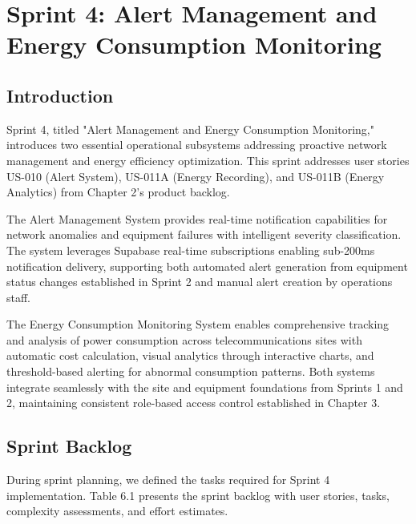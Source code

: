 \newpage

\chapter{Sprint 4: Alert Management and Energy Consumption Monitoring}

\cfoot{\thepage}

\parindent=0.5in
\onehalfspacing

\section{Introduction}

Sprint 4, titled "Alert Management and Energy Consumption Monitoring," introduces two essential operational subsystems addressing proactive network management and energy efficiency optimization. This sprint addresses user stories US-010 (Alert System), US-011A (Energy Recording), and US-011B (Energy Analytics) from Chapter 2's product backlog.

The Alert Management System provides real-time notification capabilities for network anomalies and equipment failures with intelligent severity classification. The system leverages Supabase real-time subscriptions enabling sub-200ms notification delivery, supporting both automated alert generation from equipment status changes established in Sprint 2 and manual alert creation by operations staff.

The Energy Consumption Monitoring System enables comprehensive tracking and analysis of power consumption across telecommunications sites with automatic cost calculation, visual analytics through interactive charts, and threshold-based alerting for abnormal consumption patterns. Both systems integrate seamlessly with the site and equipment foundations from Sprints 1 and 2, maintaining consistent role-based access control established in Chapter 3.

\section{Sprint Backlog}

During sprint planning, we defined the tasks required for Sprint 4 implementation. Table 6.1 presents the sprint backlog with user stories, tasks, complexity assessments, and effort estimates.


